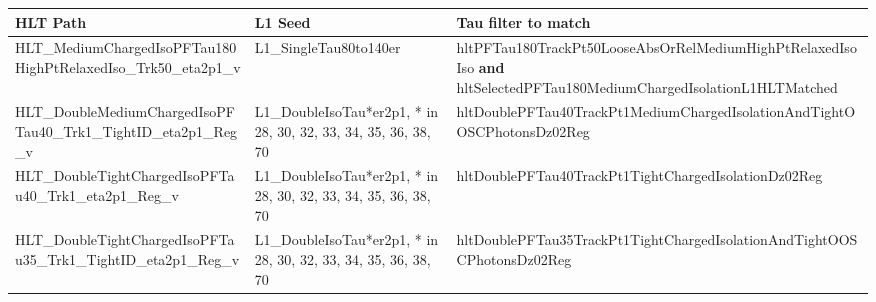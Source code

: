 {\footnotesize
\begin{tabular}{|p{3cm} p{2.5cm} p{8.9cm}|}
\hline
HLT Path & L1 Seed & Tau filter to match \\
\hline
HLT\_MediumChargedIsoPFTau180HighPtRelaxedIso\_Trk50\_eta2p1\_v
&
L1\_SingleTau80to140er
&
hltPFTau180TrackPt50LooseAbsOrRelMediumHighPtRelaxedIsoIso \textbf{and} hltSelectedPFTau180MediumChargedIsolationL1HLTMatched
\\
HLT\_DoubleMediumChargedIsoPFTau40\_Trk1\_TightID\_eta2p1\_Reg\_v
&
L1\_DoubleIsoTau*er2p1, * in 28, 30, 32, 33, 34, 35, 36, 38, 70
&
hltDoublePFTau40TrackPt1MediumChargedIsolationAndTightOOSCPhotonsDz02Reg
\\
HLT\_DoubleTightChargedIsoPFTau40\_Trk1\_eta2p1\_Reg\_v
&
L1\_DoubleIsoTau*er2p1, * in 28, 30, 32, 33, 34, 35, 36, 38, 70
&
hltDoublePFTau40TrackPt1TightChargedIsolationDz02Reg
\\
HLT\_DoubleTightChargedIsoPFTau35\_Trk1\_TightID\_eta2p1\_Reg\_v
&
L1\_DoubleIsoTau*er2p1, * in 28, 30, 32, 33, 34, 35, 36, 38, 70
&
hltDoublePFTau35TrackPt1TightChargedIsolationAndTightOOSCPhotonsDz02Reg
\\
\hline
\end{tabular}
}